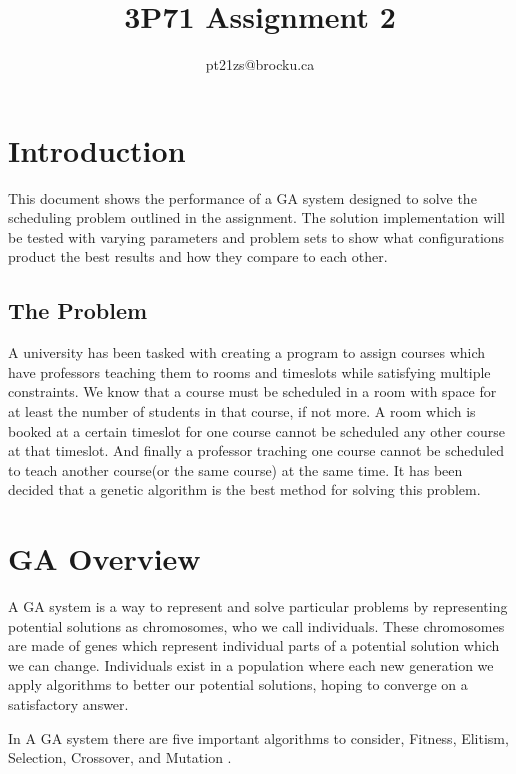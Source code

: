 \documentclass[conference]{IEEEtran}
\begin{document}
\title{3P71 Assignment 2\\}

\author{
    pt21zs@brocku.ca
}
\maketitle

\section{Introduction}
This document shows the performance of a GA system designed to solve the scheduling problem outlined in the assignment. The solution implementation will be tested with varying parameters and problem sets to show what configurations product the best results and how they compare to each other.

\subsection{The Problem}
A university has been tasked with creating a program to assign courses which have professors teaching them to rooms and timeslots while satisfying multiple constraints. We know that a course must be scheduled in a room with space for at least the number of students in that course, if not more. A room which is booked at a certain timeslot for one course cannot be scheduled any other course at that timeslot. And finally a professor traching one course cannot be scheduled to teach another course(or the same course) at the same time. It has been decided that a genetic algorithm is the best method for solving this problem.

\section{GA Overview}
A GA system is a way to represent and solve particular problems by representing potential solutions as chromosomes, who we call individuals. These chromosomes are made of genes which represent individual parts of a potential solution which we can change. Individuals exist in a population where each new generation we apply algorithms to better our potential solutions, hoping to converge on a satisfactory answer\cite[p. 3]{ga-tut1}. \vspace{8pt}

In A GA system there are five important algorithms to consider, Fitness, Elitism, Selection, Crossover, and Mutation \cite[p. 6]{ga-tut1}. \vspace{8pt}
\end{document}

